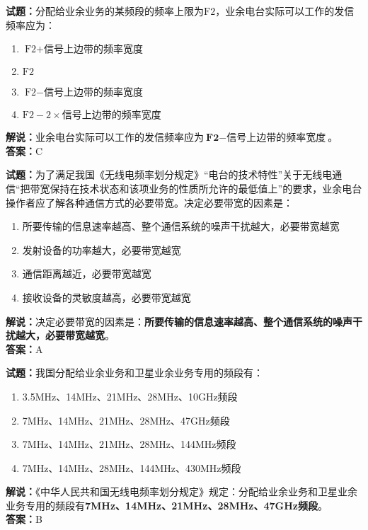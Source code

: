 \documentclass{ctexbook}
\begin{document}
\vspace{1em}

\textbf{试题：}分配给业余业务的某频段的频率上限为\(\textrm{F2}\)，业余电台实际可以工作的发信频率应为：
\begin{enumerate}[leftmargin=3em]
  \item \(\textrm{F2} + \textrm{信号上边带的频率宽度}\)
  \item \(\textrm{F2}\)
  \item \(\textrm{F2} - \textrm{信号上边带的频率宽度}\)
  \item \(\textrm{F2} - 2 \times \textrm{信号上边带的频率宽度}\)
\end{enumerate}
\noindent\textbf{解说：}业余电台实际可以工作的发信频率应为\(\textbf{F2} - \textbf{信号上边带的频率宽度}\)。
\\\noindent\textbf{答案：}C

\vspace{1em}

\textbf{试题：}为了满足我国《无线电频率划分规定》“电台的技术特性”关于无线电通信“把带宽保持在技术状态和该项业务的性质所允许的最低值上”的要求，业余电台操作者应了解各种通信方式的必要带宽。决定必要带宽的因素是：
\begin{enumerate}[leftmargin=3em]
  \item 所要传输的信息速率越高、整个通信系统的噪声干扰越大，必要带宽越宽
  \item 发射设备的功率越大，必要带宽越宽
  \item 通信距离越近，必要带宽越宽
  \item 接收设备的灵敏度越高，必要带宽越宽
\end{enumerate}
\noindent\textbf{解说：}决定必要带宽的因素是：\textbf{所要传输的信息速率越高、整个通信系统的噪声干扰越大，必要带宽越宽}。\\\noindent\textbf{答案：}A

\vspace{1em}

\textbf{试题：}我国分配给业余业务和卫星业余业务专用的频段有：
\begin{enumerate}[leftmargin=3em]
  \item 3.5\unit{\MHz}、14\unit{\MHz}、21\unit{\MHz}、28\unit{\MHz}、10\unit{\GHz}频段
  \item 7\unit{\MHz}、14\unit{\MHz}、21\unit{\MHz}、28\unit{\MHz}、47\unit{\GHz}频段
  \item 7\unit{\MHz}、14\unit{\MHz}、21\unit{\MHz}、28\unit{\MHz}、144\unit{\MHz}频段
  \item 7\unit{\MHz}、14\unit{\MHz}、28\unit{\MHz}、144\unit{\MHz}、430\unit{\MHz}频段
\end{enumerate}
\noindent\textbf{解说：}《中华人民共和国无线电频率划分规定》规定：分配给业余业务和卫星业余业务专用的频段有\textbf{7\unit{\MHz}、14\unit{\MHz}、21\unit{\MHz}、28\unit{\MHz}、47\unit{\GHz}频段}。\\\noindent\textbf{答案：}B
\end{document}
